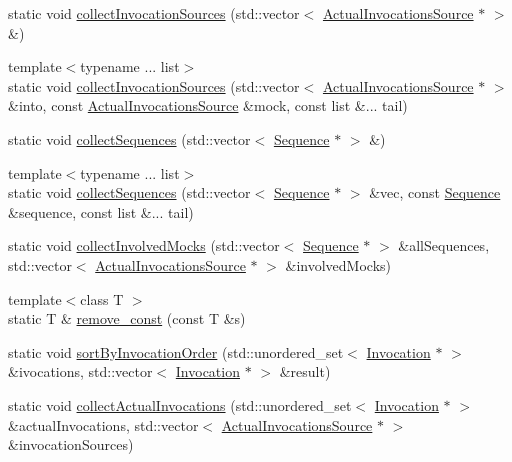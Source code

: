 \begin{DoxyCompactItemize}
static void \mbox{\hyperlink{structfakeit_1_1InvocationUtils_abf6eefccad9f9e43592a11ed5772c2ab}{collect\+Invocation\+Sources}} (std\+::vector$<$ \mbox{\hyperlink{structfakeit_1_1ActualInvocationsSource}{Actual\+Invocations\+Source}} $\ast$ $>$ \&)
\item 
{\footnotesize template$<$typename ... list$>$ }\\static void \mbox{\hyperlink{structfakeit_1_1InvocationUtils_aa88116bb054d94ddc8a3a942f5fc3dd2}{collect\+Invocation\+Sources}} (std\+::vector$<$ \mbox{\hyperlink{structfakeit_1_1ActualInvocationsSource}{Actual\+Invocations\+Source}} $\ast$ $>$ \&into, const \mbox{\hyperlink{structfakeit_1_1ActualInvocationsSource}{Actual\+Invocations\+Source}} \&mock, const list \&... tail)
\item 
static void \mbox{\hyperlink{structfakeit_1_1InvocationUtils_ac2d11afbe797cdd0978cf42a25c4c1a6}{collect\+Sequences}} (std\+::vector$<$ \mbox{\hyperlink{classfakeit_1_1Sequence}{Sequence}} $\ast$ $>$ \&)
\item 
{\footnotesize template$<$typename ... list$>$ }\\static void \mbox{\hyperlink{structfakeit_1_1InvocationUtils_a43b674a2f1109acf4c870e8fb9c2571d}{collect\+Sequences}} (std\+::vector$<$ \mbox{\hyperlink{classfakeit_1_1Sequence}{Sequence}} $\ast$ $>$ \&vec, const \mbox{\hyperlink{classfakeit_1_1Sequence}{Sequence}} \&sequence, const list \&... tail)
\item 
static void \mbox{\hyperlink{structfakeit_1_1InvocationUtils_a8a2610f9bc4c88cb2705221970bb93d6}{collect\+Involved\+Mocks}} (std\+::vector$<$ \mbox{\hyperlink{classfakeit_1_1Sequence}{Sequence}} $\ast$ $>$ \&all\+Sequences, std\+::vector$<$ \mbox{\hyperlink{structfakeit_1_1ActualInvocationsSource}{Actual\+Invocations\+Source}} $\ast$ $>$ \&involved\+Mocks)
\item 
{\footnotesize template$<$class T $>$ }\\static T \& \mbox{\hyperlink{structfakeit_1_1InvocationUtils_ad92724e2654997a1db229644d7f2ada9}{remove\+\_\+const}} (const T \&s)
\item 
static void \mbox{\hyperlink{structfakeit_1_1InvocationUtils_a0badf7e54dd25b44d90b174d6ac39fa3}{sort\+By\+Invocation\+Order}} (std\+::unordered\+\_\+set$<$ \mbox{\hyperlink{structfakeit_1_1Invocation}{Invocation}} $\ast$ $>$ \&ivocations, std\+::vector$<$ \mbox{\hyperlink{structfakeit_1_1Invocation}{Invocation}} $\ast$ $>$ \&result)
\item 
static void \mbox{\hyperlink{structfakeit_1_1InvocationUtils_a0bb553d912e1d41f5fc1cf2d16ae9e55}{collect\+Actual\+Invocations}} (std\+::unordered\+\_\+set$<$ \mbox{\hyperlink{structfakeit_1_1Invocation}{Invocation}} $\ast$ $>$ \&actual\+Invocations, std\+::vector$<$ \mbox{\hyperlink{structfakeit_1_1ActualInvocationsSource}{Actual\+Invocations\+Source}} $\ast$ $>$ \&invocation\+Sources)

\end{DoxyCompactItemize}
